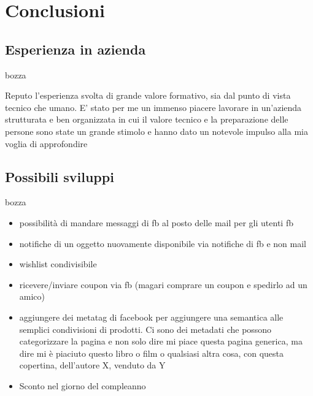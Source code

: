 \chapter{Conclusioni}
\section{Esperienza in azienda}

bozza

Reputo l’esperienza svolta di grande valore formativo, sia dal punto di vista tecnico che umano. E’ stato per me un immenso piacere lavorare in un’azienda strutturata e ben organizzata in cui il valore tecnico e la preparazione delle persone sono state un grande stimolo e hanno dato un notevole impulso alla mia voglia di approfondire 
\section{Possibili sviluppi}
bozza


\begin{itemize}
	\item possibilità di mandare messaggi di fb al posto delle mail per gli utenti fb
	\item notifiche di un oggetto nuovamente disponibile via notifiche di fb e non mail
	\item wishlist condivisibile
	\item ricevere/inviare coupon via fb (magari comprare un coupon e spedirlo ad un amico)
	\item aggiungere dei metatag di facebook per aggiungere una semantica alle semplici condivisioni di prodotti. Ci sono dei metadati che possono categorizzare la pagina e non solo dire mi piace questa pagina generica, ma dire mi è piaciuto questo libro o film o qualsiasi altra cosa, con questa copertina, dell’autore X, venduto da Y
	\item Sconto nel giorno del compleanno
\end{itemize}

